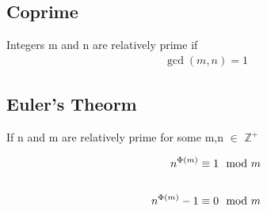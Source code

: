 \documentclass[12pt]{article}
\begin{document}
\subsection{Coprime}
Integers m and n are relatively prime if 
\begin{align}
\gcd (m,n) = 1
\end{align}

\subsection{Euler's Theorm}
If 
n
and
m
are
relatively
prime 
for
some
m,n $\in$ $\mathbb{Z}^+$

\begin{subequations}
\begin{align}
n^{\Phi(m)}\equiv 1\mod{m}\\
\intertext{ }
n^{\Phi(m)} - 1\equiv 0\mod{m}
\end{align}
\end{subequations}
\end{document}
